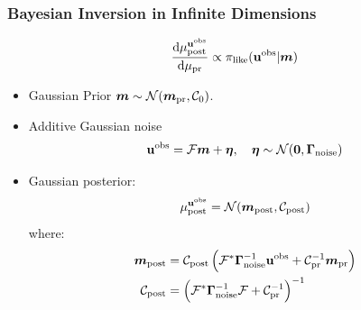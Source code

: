 \documentclass[
  pdf,
  10pt,
  xcolor={svgnames},
]{beamer}
\newcommand{\mc}[1]{\mathcal{#1}}
\renewcommand{\vec}[1]{{\mathchoice
                     {\mbox{\boldmath$\displaystyle{#1}$}}
                     {\mbox{\boldmath$\textstyle{#1}$}}
                     {\mbox{\boldmath$\scriptstyle{#1}$}}
                     {\mbox{\boldmath$\scriptscriptstyle{#1}$}}}}
\newcommand{\mat}[1]{\mathbf{{#1}}}
\newcommand{\obs}{\mathbf{u}^{\rm obs}}
\begin{document}
\begin{frame}
  \frametitle{Bayesian Inversion in Infinite Dimensions}
  \begin{theorem}
    \[
      \dv{\mu^{\obs}_{\rm post}}{\mu_{\rm pr}}
      \propto
      \pi_{\rm like}(\obs | \vec{m})
    \]
  \end{theorem}
  \begin{itemize}
    \item Gaussian Prior $\vec{m} \sim \mc{N}(\vec{m}_{\rm pr}, \mc{C}_0)$.
    \item Additive Gaussian noise
      \[
        \obs = \mc{F} \vec{m} + \vb*{\eta},
        \quad \vb*{\eta} \sim \mc{N}(\vb{0}, \mat{\Gamma}_{\rm noise})
      \]
    \item Gaussian posterior:
      \[
        \mu^{\obs}_{\rm post}
        =
        \mc{N}(\vec{m}_{\rm post} , \mc{C}_{\rm post})
      \]
      where:
      \begin{align*}
        \vec{m}_{\rm post}
        &=
        \mc{C}_{\rm post}
        \left(
          \mc{F}^* \vb{\Gamma}_{\rm noise}^{-1} \obs
          + \mc{C}_{\rm pr}^{-1} \vec{m}_{\rm pr}
        \right) \\
        \mc{C}_{\rm post}
        &=
        \left(
          \mc{F}^* \vb{\Gamma}_{\rm noise}^{-1} \mc{F}
          + \mc{C}_{\rm pr}^{-1}
        \right)^{-1} \\
      \end{align*}
  \end{itemize} \vspace{-1em}
\end{frame}
\end{document}

